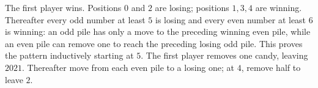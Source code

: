 The first player wins. Positions $0$ and $2$ are losing; positions $1,3,4$ are winning. Thereafter every odd number at least $5$ is losing and every even number at least $6$ is winning: an odd pile has only a move to the preceding winning even pile, while an even pile can remove one to reach the preceding losing odd pile. This proves the pattern inductively starting at $5$. The first player removes one candy, leaving $2021$. Thereafter move from each even pile to a losing one; at $4$, remove half to leave $2$.
